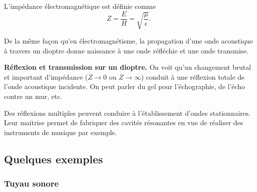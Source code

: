 \begin{remarque}
L'impédance électromagnétique est définie comme
\begin{equation*}
Z = \frac{E}{H} = \sqrt{\frac{\mu}{\epsilon}}.
\end{equation*}
\end{remarque}

De la même façon qu'en électromagnétisme, la propagation d'une onde acoustique à travers un dioptre donne naissance à une onde réfléchie et une onde transmise.
\begin{slide}
\textbf{Réflexion et transmission sur un dioptre.}
On voit qu'un changement brutal et important d'impédance ($Z\rightarrow 0$ ou $Z\rightarrow \infty$) conduit à une réflexion totale de l'onde acoustique incidente.
On peut parler du gel pour l'échographie, de l'écho contre un mur, etc.
\end{slide}

\begin{transition}
Des réflexions multiples peuvent conduire à l'établissement d'ondes stationnaires.
Leur maitrise permet de fabriquer des cavités résonantes en vue de réaliser des instruments de musique par exemple.
\end{transition}

\subsection{Quelques exemples}

\subsubsection{Tuyau sonore}

